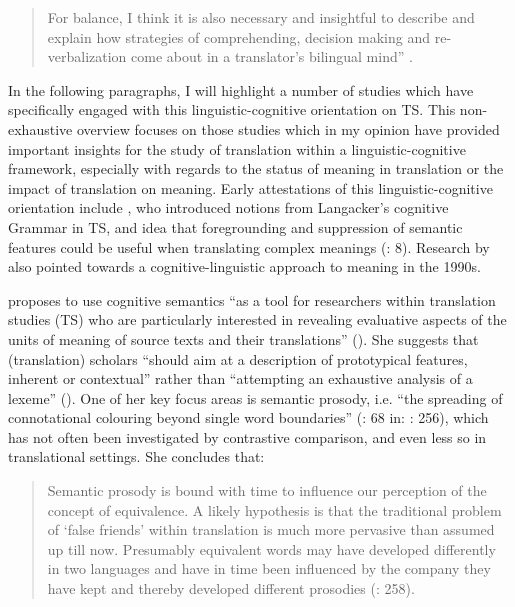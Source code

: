 \begin{quote}
For balance, I think it is also necessary and insightful to describe and explain how strategies of comprehending, decision making and re-verbalization come about in a translator’s bilingual mind” \citep[46]{house_towards_2013}. 
\end{quote}


In the following paragraphs, I will highlight a number of studies which have specifically engaged with this linguistic-cognitive orientation on TS. This non-exhaustive overview focuses on those studies which in my opinion have provided important insights for the study of translation within a linguistic-cognitive framework, especially with regards to the status of meaning in translation or the impact of translation on meaning. Early attestations of this linguistic-cognitive orientation include \citet{tabakowska_cognitive_1993}, who introduced notions from Langacker’s cognitive Grammar in TS, and  idea that foregrounding and suppression of semantic features could be useful when translating complex meanings (\citealt{rojo_cognitive_2013}: 8). Research by \citet{wilss_knowledge_1996} also pointed towards a cognitive-linguistic approach to meaning in the 1990s.



\citeyear{korning_zethsen_corpus-based_2008} proposes to use cognitive semantics “as a tool for researchers within translation studies (TS) who are particularly interested in revealing evaluative aspects of the units of meaning of source texts and their translations” (\citeyear[249]{2008}). She suggests that (translation) scholars “should aim at a description of prototypical features, inherent or contextual” rather than “attempting an exhaustive analysis of a lexeme” (\citeyear[251]{2008}). One of her key focus areas is semantic prosody, i.e. “the spreading of connotational colouring beyond single word boundaries” (\citealt{partington_patterns_1998}: 68 in: \citealt{korning_zethsen_corpus-based_2008}: 256), which has not often been investigated by contrastive comparison, and even less so in translational settings. She concludes that:


\begin{quote}
Semantic prosody is bound with time to influence our perception of the concept of equivalence. A likely hypothesis is that the traditional problem of ‘false friends’ within translation is much more pervasive than assumed up till now. Presumably equivalent words may have developed differently in two languages and have in time been influenced by the company they have kept and thereby developed different prosodies (\citealt{korning_zethsen_corpus-based_2008}: 258).
\end{quote}


